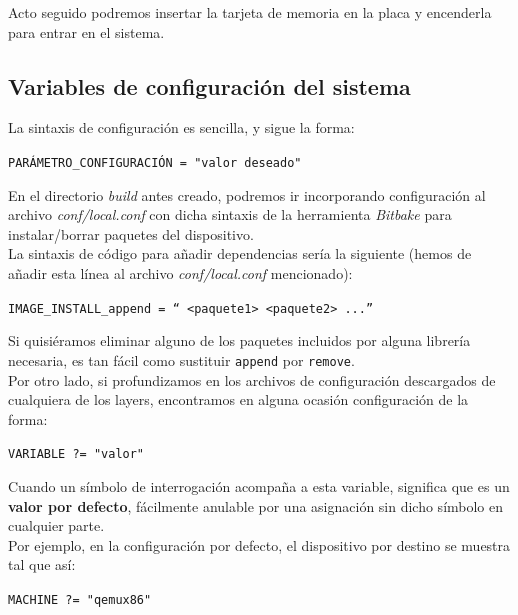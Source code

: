 Acto seguido podremos insertar la tarjeta de memoria en la placa y encenderla para entrar en el sistema.

\subsection{Variables de configuración del sistema}

La sintaxis de configuración es sencilla, y sigue la forma: 

\begin{center}
	\texttt{PARÁMETRO\_CONFIGURACIÓN = "valor deseado"}
\end{center}

En el directorio \textit{build} antes creado, podremos ir incorporando configuración al archivo \textit{conf/local.conf} con dicha sintaxis de la herramienta \textit{Bitbake} para instalar/borrar paquetes del dispositivo.\\

La sintaxis de código para añadir dependencias sería la siguiente (hemos de añadir esta línea al archivo \textit{conf/local.conf} mencionado):

\begin{center}
\texttt{IMAGE\_INSTALL\_append = `` <paquete1> <paquete2> ...''}
\end{center}

Si quisiéramos eliminar alguno de los paquetes incluidos por alguna librería necesaria, es tan fácil como sustituir \texttt{append} por \texttt{remove}.\\

Por otro lado, si profundizamos en los archivos de configuración descargados de cualquiera de los layers, encontramos en alguna ocasión configuración de la forma:

\begin{center}
\texttt{VARIABLE ?= "valor"}
\end{center}

Cuando un símbolo de interrogación acompaña a esta variable, significa que es un \textbf{valor por defecto}, fácilmente anulable por una asignación sin dicho símbolo en cualquier parte.\\

Por ejemplo, en la configuración por defecto, el dispositivo por destino se muestra tal que así:

\begin{center}
\texttt{MACHINE ?= "qemux86"}
\end{center}

